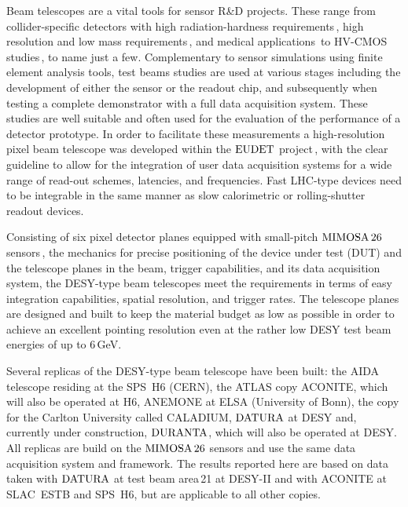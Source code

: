 

Beam telescopes are a vital tools for sensor R\&D projects. 
These range from collider-specific detectors with high radiation-hardness requirements\,\cite{Nurnberg:2014aya, Garcia-Argos:2015zda},
 high resolution and low mass requirements\,\cite{???}, and medical applications\,\cite{Ballabriga2011S15} to HV-CMOS studies\,\cite{1748-0221-7-08-C08002}, to name just a few.
Complementary to sensor simulations using finite element analysis tools, test beams studies are used at various stages including the development of either the sensor or the readout chip,
 and subsequently when testing a complete demonstrator with a full data acquisition system. 
These studies are well suitable and often used for the evaluation of the performance of a detector prototype. %
In order to facilitate these measurements a high-resolution pixel beam telescope was developed within the $\textrm{EUDET}$ project\,\cite{ref:eudetreport200902},
 with the clear guideline to allow for the integration of user data acquisition systems for a wide range of read-out schemes, latencies, and frequencies. 
Fast LHC-type devices need to be integrable in the same manner as slow calorimetric or rolling-shutter readout devices. 

Consisting of six pixel detector planes equipped with small-pitch $\textrm{MIMOSA\,26}$ sensors\,\cite{HuGuo2010480},
 the mechanics for precise positioning of the device under test (DUT) and the telescope planes in the beam, trigger capabilities, and its data acquisition system, 
 the DESY-type beam telescopes meet the requirements in terms of easy integration capabilities, spatial resolution, and trigger rates. 
The telescope planes are designed and built to keep the material budget as low as possible in order to achieve an excellent pointing resolution
 even at the rather low DESY test beam energies of up to 6\,GeV.

Several replicas of the DESY-type beam telescope have been built:
 the AIDA telescope residing at the SPS~H6 (CERN), the ATLAS copy ACONITE, which will also be operated at H6, ANEMONE at ELSA (University of Bonn), the copy for the Carlton University called CALADIUM, 
 $\textrm{DATURA}$ at DESY and, currently under construction, $\textrm{DURANTA}$, which will also be operated at DESY. 
All replicas are build on the $\textrm{MIMOSA\,26}$ sensors and use the same data acquisition system and framework. 
The results reported here are based on data taken with $\textrm{DATURA}$ at test beam area\,21 at {DESY-II} and with ACONITE at SLAC~ESTB and SPS~H6, but are applicable to all other copies. 

